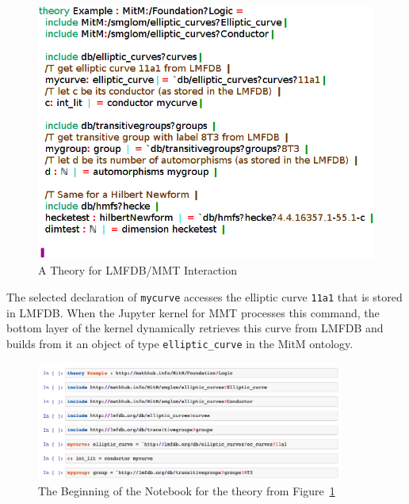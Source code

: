 \begin{figure}
  \includegraphics[width=\linewidth]{../D4.11/hecke}\vspace*{-1em}
  \caption{A Theory for LMFDB/MMT Interaction}\label{fig:hecke}\vspace*{-3em}
\end{figure}
The selected declaration of \texttt{mycurve} accesses the elliptic curve \texttt{11a1} that is stored in LMFDB.
When the Jupyter kernel for MMT processes this command, the bottom layer of the kernel dynamically retrieves this curve from LMFDB and builds from it an object of type \texttt{elliptic\_curve} in the MitM ontology.\bigskip

\begin{figure}[ht]\centering
  \includegraphics[width=0.9\textwidth]{screenshots/heckenb}
  \caption{The Beginning of the Notebook for the theory from Figure~\ref{fig:hecke}}\label{fig:lmfdbexample}
\end{figure}

